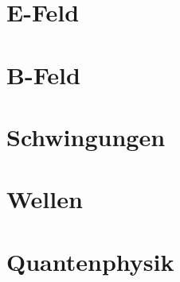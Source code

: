 \documentclass[a4paper,12pt,twoside,openany]{scrbook}
\begin{document}
\newpage


\tableofcontents

\sloppy

\part{E-Feld}


\part{B-Feld}

\part{Schwingungen}

\part{Wellen}

\part{Quantenphysik}

\end{document}

